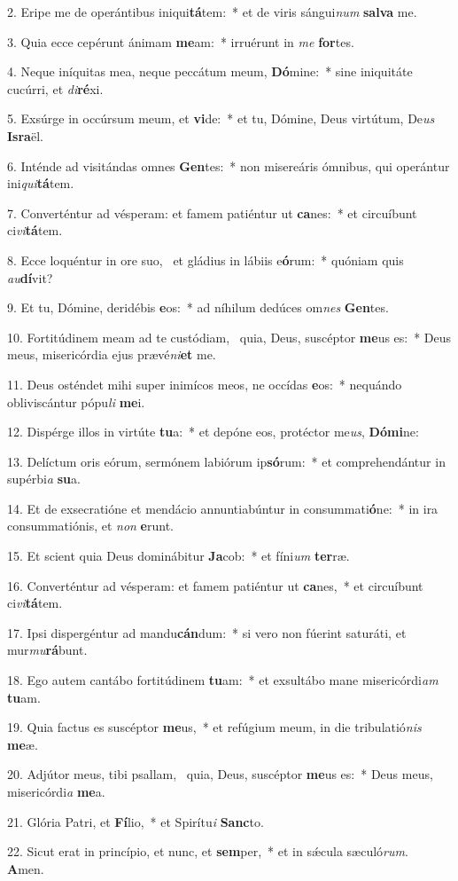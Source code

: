 2. Eripe me de operántibus iniqui\textbf{tá}tem:~*  et de viris sángui\textit{num} \textbf{sal}\textbf{va} me.\

3. Quia ecce cepérunt ánimam \textbf{me}am:~*  irruérunt in \textit{me} \textbf{for}tes.\

4. Neque iníquitas mea, neque peccátum meum, \textbf{Dó}mine:~*  sine iniquitáte cucúrri, et \textit{di}\textbf{ré}xi.\

5. Exsúrge in occúrsum meum, et \textbf{vi}de:~*  et tu, Dómine, Deus virtútum, De\textit{us} \textbf{Is}\textbf{ra}ël.\

6. Inténde ad visitándas omnes \textbf{Gen}tes:~*  non misereáris ómnibus, qui operántur ini\textit{qui}\textbf{tá}tem.\

7. Converténtur ad vésperam: et famem patiéntur ut \textbf{ca}nes:~*  et circuíbunt ci\textit{vi}\textbf{tá}tem.\

8. Ecce loquéntur in ore suo, \dag\  et gládius in lábiis e\textbf{ó}rum:~*  quóniam quis \textit{au}\textbf{dí}vit?\

9. Et tu, Dómine, deridébis \textbf{e}os:~*  ad níhilum dedúces om\textit{nes} \textbf{Gen}tes.\

10. Fortitúdinem meam ad te custódiam, \dag\  quia, Deus, suscéptor \textbf{me}us es:~*  Deus meus, misericórdia ejus prævé\textit{ni}\textbf{et} me.\

11. Deus osténdet mihi super inimícos meos, ne occídas \textbf{e}os:~*  nequándo obliviscántur pópu\textit{li} \textbf{me}i.\

12. Dispérge illos in virtúte \textbf{tu}a:~*  et depóne eos, protéctor me\textit{us}, \textbf{Dó}\textbf{mi}ne:\

13. Delíctum oris eórum, sermónem labiórum ip\textbf{só}rum:~*  et comprehendántur in supérbi\textit{a} \textbf{su}a.\

14. Et de exsecratióne et mendácio annuntiabúntur in consummati\textbf{ó}ne:~*  in ira consummatiónis, et \textit{non} \textbf{e}runt.\

15. Et scient quia Deus dominábitur \textbf{Ja}cob:~*  et fíni\textit{um} \textbf{ter}ræ.\

16. Converténtur ad vésperam: et famem patiéntur ut \textbf{ca}nes,~*  et circuíbunt ci\textit{vi}\textbf{tá}tem.\

17. Ipsi dispergéntur ad mandu\textbf{cán}dum:~*  si vero non fúerint saturáti, et mur\textit{mu}\textbf{rá}bunt.\

18. Ego autem cantábo fortitúdinem \textbf{tu}am:~*  et exsultábo mane misericórdi\textit{am} \textbf{tu}am.\

19. Quia factus es suscéptor \textbf{me}us,~*  et refúgium meum, in die tribulatió\textit{nis} \textbf{me}æ.\

20. Adjútor meus, tibi psallam, \dag\  quia, Deus, suscéptor \textbf{me}us es:~*  Deus meus, misericórdi\textit{a} \textbf{me}a.\

21. Glória Patri, et \textbf{Fí}lio,~*  et Spirítu\textit{i} \textbf{Sanc}to.\

22. Sicut erat in princípio, et nunc, et \textbf{sem}per,~*  et in sǽcula sæculó\textit{rum}. \textbf{A}men.\

